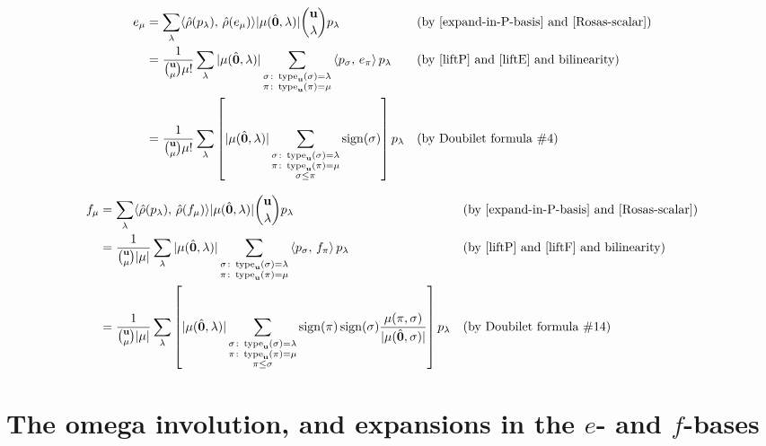\begin{align*}
e_\mu &= \sum_\lambda \langle \hat\rho(p_\lambda),\,\hat\rho(e_\mu)\rangle |\mu(\hat{\mathbf{0}},\lambda)| \binom{\mathbf{u}}{\lambda} p_\lambda
	&&\text{(by~\eqref{expand-in-P-basis} and~\eqref{Rosas-scalar})}\\
&= \frac{1}{\binom{\mathbf{u}}{\mu} \mu!} \sum_\lambda |\mu(\hat{\mathbf{0}},\lambda)| \sum_{\substack{\sigma\colon \operatorname{type}_{\mathbf{u}}(\sigma)=\lambda\\ \pi\colon \operatorname{type}_{\mathbf{u}}(\pi)=\mu}} \left\langle p_\sigma,\, e_\pi\right\rangle  p_\lambda
	&&\text{(by~\eqref{liftP} and~\eqref{liftE} and bilinearity)}\\
&= \frac{1}{\binom{\mathbf{u}}{\mu} \mu!} \sum_\lambda\left[ |\mu(\hat{\mathbf{0}},\lambda)| \sum_{\substack{\sigma\colon \operatorname{type}_{\mathbf{u}}(\sigma)=\lambda\\ \pi\colon \operatorname{type}_{\mathbf{u}}(\pi)=\mu\\ \sigma\leq\pi}} \operatorname{sign}(\sigma) \right] p_\lambda
	&&\text{(by Doubilet formula \#4)}\\
\end{align*}

\begin{align*}
f_\mu &= \sum_\lambda \langle \hat\rho(p_\lambda),\,\hat\rho(f_\mu)\rangle |\mu(\hat{\mathbf{0}},\lambda)| \binom{\mathbf{u}}{\lambda} p_\lambda
	&&\text{(by~\eqref{expand-in-P-basis} and~\eqref{Rosas-scalar})}\\
&= \frac{1}{\binom{\mathbf{u}}{\mu}|\mu|} \sum_\lambda |\mu(\hat{\mathbf{0}},\lambda)| \sum_{\substack{\sigma\colon \operatorname{type}_{\mathbf{u}}(\sigma)=\lambda\\ \pi\colon \operatorname{type}_{\mathbf{u}}(\pi)=\mu}} \left\langle p_\sigma,\, f_\pi\right\rangle  p_\lambda
	&&\text{(by~\eqref{liftP} and~\eqref{liftF} and bilinearity)}\\
&= \frac{1}{\binom{\mathbf{u}}{\mu}|\mu|} \sum_\lambda\left[ |\mu(\hat{\mathbf{0}},\lambda)| \sum_{\substack{\sigma\colon \operatorname{type}_{\mathbf{u}}(\sigma)=\lambda\\ \pi\colon \operatorname{type}_{\mathbf{u}}(\pi)=\mu\\ \pi\leq\sigma}}\operatorname{sign}(\pi)\operatorname{sign}(\sigma)\frac{\mu(\pi,\sigma)}{|\mu(\hat{\mathbf{0}},\sigma)|} \right] p_\lambda
	&&\text{(by Doubilet formula \#14)}\\
\end{align*}

\section{The omega involution, and expansions in the $e$- and $f$-bases}

